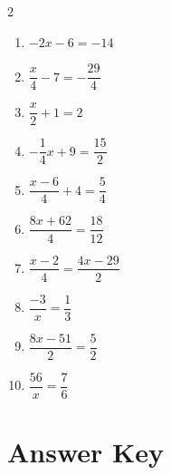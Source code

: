 \documentclass[11pt]{article}
\begin{document}
\begin{multicols}{2}
\begin{enumerate}
  \item $-2x - 6 = -14$
  \vspace{1.4cm}
  \item $\dfrac{x}{4} - 7 = -\dfrac{29}{4}$
  \vspace{1.4cm}
  \item $\dfrac{x}{2} + 1 = 2$
  \vspace{1.4cm}
  \item $-\dfrac{1}{4}x + 9 = \dfrac{15}{2}$
  \vspace{1.4cm}
  \item $\dfrac{x - 6}{4} + 4 = \dfrac{5}{4}$
  \vspace{1.4cm}
  \item $\dfrac{8x + 62}{4} = \dfrac{18}{12}$
  \vspace{1.4cm}
  \item $\dfrac{x - 2}{4} = \dfrac{4x - 29}{2}$
  \vspace{1.4cm}
  \item $\dfrac{-3}{x} = \dfrac{1}{3}$
  \vspace{1.4cm}
  \item $\dfrac{8x - 51}{2} = \dfrac{5}{2}$
  \vspace{1.4cm}
  \item $\dfrac{56}{x} = \dfrac{7}{6}$
  \vspace{1.4cm}
\end{enumerate}
\end{multicols}

\newpage
{}
\section*{Answer Key}
\end{document}
